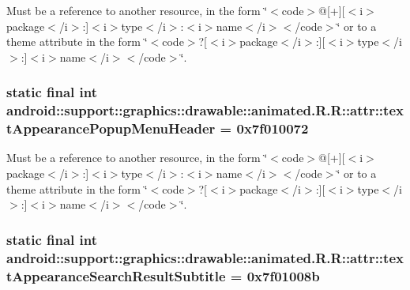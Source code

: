 Must be a reference to another resource, in the form \char`\"{}$<$code$>$@\mbox{[}+\mbox{]}\mbox{[}$<$i$>$package$<$/i$>$:\mbox{]}$<$i$>$type$<$/i$>$:$<$i$>$name$<$/i$>$$<$/code$>$\char`\"{} or to a theme attribute in the form \char`\"{}$<$code$>$?\mbox{[}$<$i$>$package$<$/i$>$:\mbox{]}\mbox{[}$<$i$>$type$<$/i$>$:\mbox{]}$<$i$>$name$<$/i$>$$<$/code$>$\char`\"{}. \hypertarget{classandroid_1_1support_1_1graphics_1_1drawable_1_1animated_1_1_r_1_1attr_88bd262e484fffe9233f1088d6a750e6}{
\subsubsection[{textAppearancePopupMenuHeader}]{\setlength{\rightskip}{0pt plus 5cm}static final int android::support::graphics::drawable::animated.R.R::attr::textAppearancePopupMenuHeader = 0x7f010072}}
\label{classandroid_1_1support_1_1graphics_1_1drawable_1_1animated_1_1_r_1_1attr_88bd262e484fffe9233f1088d6a750e6}


Must be a reference to another resource, in the form \char`\"{}$<$code$>$@\mbox{[}+\mbox{]}\mbox{[}$<$i$>$package$<$/i$>$:\mbox{]}$<$i$>$type$<$/i$>$:$<$i$>$name$<$/i$>$$<$/code$>$\char`\"{} or to a theme attribute in the form \char`\"{}$<$code$>$?\mbox{[}$<$i$>$package$<$/i$>$:\mbox{]}\mbox{[}$<$i$>$type$<$/i$>$:\mbox{]}$<$i$>$name$<$/i$>$$<$/code$>$\char`\"{}. \hypertarget{classandroid_1_1support_1_1graphics_1_1drawable_1_1animated_1_1_r_1_1attr_638709139b0e837e1b9ab591c1ef544d}{
\subsubsection[{textAppearanceSearchResultSubtitle}]{\setlength{\rightskip}{0pt plus 5cm}static final int android::support::graphics::drawable::animated.R.R::attr::textAppearanceSearchResultSubtitle = 0x7f01008b}}
\label{classandroid_1_1support_1_1graphics_1_1drawable_1_1animated_1_1_r_1_1attr_638709139b0e837e1b9ab591c1ef544d}


